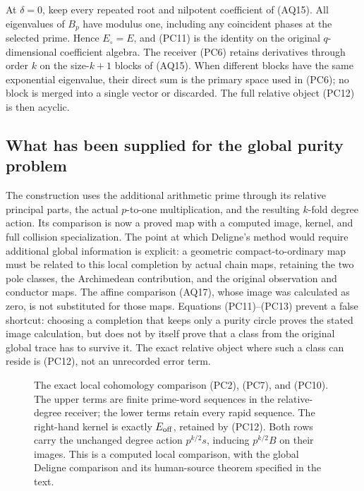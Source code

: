 \documentclass[11pt,a4paper]{article}
\theoremstyle{definition}\newtheorem{definition}[theorem]{Definition}
\begin{document}
At $\delta=0$, keep every repeated root and nilpotent coefficient of
(AQ15). All eigenvalues of $B_p$ have modulus one, including any
coincident phases at the selected prime. Hence $E_\circ=E$, and
(PC11) is the identity on the original $q$-dimensional coefficient
algebra. The receiver (PC6) retains derivatives through order $k$
on the size-$k+1$ blocks of (AQ15). When different blocks have the
same exponential eigenvalue, their direct sum is the primary space
used in (PC6); no block is merged into a single vector or discarded.
The full relative object (PC12) is then acyclic.

\subsection{What has been supplied for the global purity problem}
The construction uses the additional arithmetic prime through its
relative principal parts, the actual $p$-to-one multiplication, and
the resulting $k$-fold degree action. Its comparison is now a proved
map with a computed image, kernel, and full collision specialization.
The point at which Deligne's method would require additional global
information is explicit: a geometric compact-to-ordinary map must
be related to this local completion by actual chain maps, retaining
the two pole classes, the Archimedean contribution, and the original
observation and conductor maps. The affine comparison (AQ17), whose
image was calculated as zero, is not substituted for those maps.
Equations (PC11)--(PC13) prevent a false shortcut: choosing a
completion that keeps only a purity circle proves the stated image
calculation, but does not by itself prove that a class from the
original global trace has to survive it. The exact relative object
where such a class can reside is (PC12), not an unrecorded error term.

\begin{figure}[ht]
\centering
{}
\caption{The exact local cohomology comparison (PC2), (PC7), and
(PC10). The upper terms are finite prime-word sequences in the
relative-degree receiver; the lower terms retain every rapid sequence.
The right-hand kernel is exactly $E_{\rm off}$, retained by (PC12).
Both rows carry the unchanged degree action $p^{k/2}s$, inducing
$p^{k/2}B$ on their images. This is a computed local comparison,
with the global Deligne comparison and its human-source theorem
specified in the text.}
\end{figure}
\end{document}

